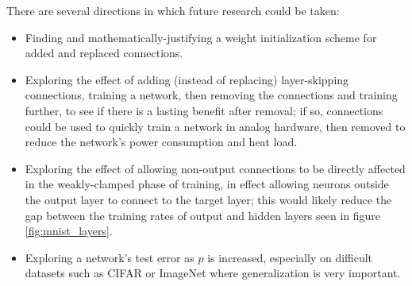 \documentclass[format=sigconf]{acmart}
\begin{document}
There are several directions in which future research could be taken:
\begin{itemize} 
\item Finding and mathematically-justifying a weight initialization scheme for added and replaced connections.
\item Exploring the effect of adding (instead of replacing) layer-skipping connections, training a network, then removing the connections and training further, to see if there is a lasting benefit after removal; if so, connections could be used to quickly train a network in analog hardware, then removed to reduce the network's power consumption and heat load. 
\item Exploring the effect of allowing non-output connections to be directly affected in the weakly-clamped phase of training, in effect allowing neurons outside the output layer to connect to the target layer; this would likely reduce the gap between the training rates of output and hidden layers seen in figure \ref{fig:mnist_layers}. 
\item Exploring a network's test error as $p$ is increased, especially on difficult datasets such as CIFAR or ImageNet where generalization is very important.
\end{itemize}




\end{document}
